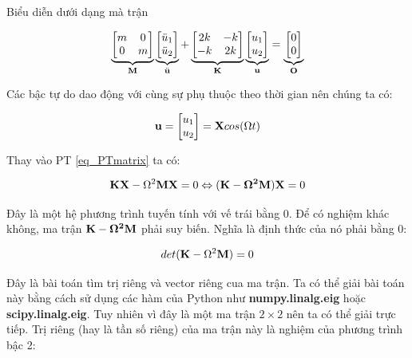 Biểu diễn dưới dạng mà trận

\begin{equation}
    \label{eq_PTmatrix}
    \underbrace{\begin{bmatrix}
        m & 0\\ 0 & m
    \end{bmatrix}}_{\bf M}\underbrace{\begin{bmatrix}
        \ddot{u}_1 \\ \ddot{u}_2
    \end{bmatrix}}_{\ddot{\bf u}} +\underbrace{\begin{bmatrix}
        2k & -k \\ -k & 2k
    \end{bmatrix}}_{\bf K} \underbrace{\begin{bmatrix}
        u_1 \\ u_2
    \end{bmatrix}}_{\bf u} = \underbrace{\begin{bmatrix}
        0 \\ 0
    \end{bmatrix}}_{\bf O} 
\end{equation}

Các bậc tự do dao động với cùng sự phụ thuộc theo thời gian nên chúng ta có:

\begin{equation}
    {\bf u} = \begin{bmatrix}
        u_1 \\ u_2
    \end{bmatrix} = {\bf X}cos(\Omega t)
\end{equation}

Thay vào PT \cref{eq_PTmatrix} ta có:

\begin{equation}
    {\bf K}{\bf X} - \Omega^2{\bf M}{\bf X} = 0 \Leftrightarrow ({\bf K-\Omega^2{\bf M}}){\bf X} = 0
\end{equation}

Đây là một hệ phương trình tuyến tính với vế trái bằng 0. Để có nghiệm khác không, ma trận $\bf K-\Omega^2{\bf M}$ phải suy biến. Nghĩa là định thức của nó phải bằng 0:

\begin{equation}
    det({\bf K}-\Omega^2{\bf M}) = 0
\end{equation}

Đây là bài toán tìm trị riêng và vector riêng cua ma trận. Ta có thể giải bài toán này bằng cách sử dụng các hàm của Python như \textbf{numpy.linalg.eig} hoặc \textbf{scipy.linalg.eig}. Tuy nhiên vì đây là một ma trận $2\times 2$ nên ta có thể giải trực tiếp. Trị riêng (hay là tần số riêng) của ma trận này là nghiệm của phương trình bậc 2:

